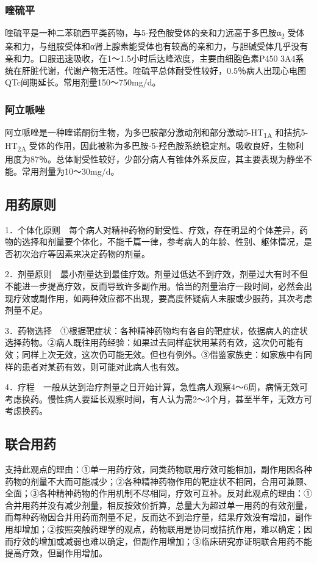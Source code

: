 \subsubsection{喹硫平}

喹硫平是一种二苯硫西平类药物，与5-羟色胺受体的亲和力远高于多巴胺α\textsubscript{2}
受体亲和力，与组胺受体和α肾上腺素能受体也有较高的亲和力，与胆碱受体几乎没有亲和力。口服迅速吸收，在1～1.5小时后达峰浓度，主要由细胞色素P450
3A4系统在肝脏代谢，代谢产物无活性。喹硫平总体耐受性较好，0.5％病人出现心电图QTc间期延长。常用剂量150～750mg/d。

\subsubsection{阿立哌唑}

阿立哌唑是一种喹诺酮衍生物，为多巴胺部分激动剂和部分激动5-HT\textsubscript{1A}
和拮抗5-HT\textsubscript{2A}
受体的作用，因此被称为多巴胺-5-羟色胺系统稳定剂。吸收良好，生物利用度为87％。总体耐受性较好，少部分病人有锥体外系反应，其主要表现为静坐不能。常用剂量为10～30mg/d。

\subsection{用药原则}

1．个体化原则　每个病人对精神药物的耐受性、疗效，存在明显的个体差异，药物的选择和剂量要个体化，不能千篇一律，参考病人的年龄、性别、躯体情况，是否初次治疗等因素来决定药物的剂量。

2．剂量原则　最小剂量达到最佳疗效。剂量过低达不到疗效，剂量过大有时不但不能进一步提高疗效，反而导致许多副作用。恰当的剂量治疗一段时间，必然会出现疗效或副作用，如两种效应都不出现，要高度怀疑病人未服或少服药，其次考虑剂量不足。

3．药物选择　①根据靶症状：各种精神药物均有各自的靶症状，依据病人的症状选择药物。②病人既往用药经验：如果过去同样症状用某药有效，这次仍可能有效；同样上次无效，这次仍可能无效。但也有例外。③借鉴家族史：如家族中有同样的患者对某药有效，则可能对此病人也有效。

4．疗程　一般从达到治疗剂量之日开始计算，急性病人观察4～6周，病情无效可考虑换药。慢性病人要延长观察时间，有人认为需2～3个月，甚至半年，无效方可考虑换药。

\subsection{联合用药}

支持此观点的理由：①单一用药疗效，同类药物联用疗效可能相加，副作用因各种药物的剂量不大而可能减少；②各种精神药物作用的靶症状不相同，合用可兼顾、全面；③各种精神药物的作用机制不尽相同，疗效可互补。反对此观点的理由：①合并用药并没有减少剂量，相反按效价折算，总量大为超过单一用药的有效剂量，而每种药物因合并用药而剂量不足，反而达不到治疗量，结果疗效没有增加，副作用却增加；②按照突触药理学的观点，药物联用是协同或拮抗作用，难以确定；因而疗效的增加或减弱也难以确定，但副作用增加；③临床研究亦证明联合用药不能提高疗效，但副作用增加。

